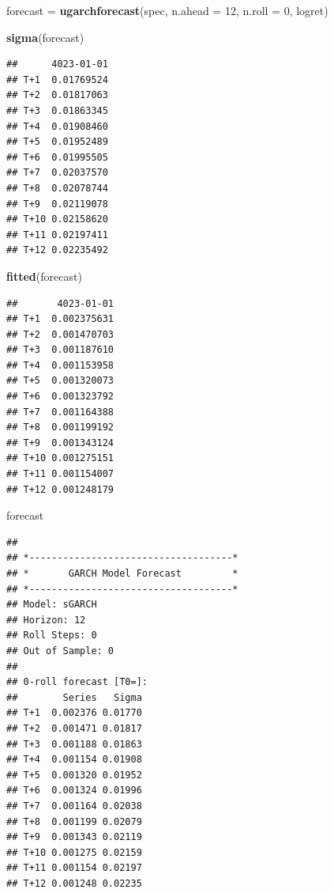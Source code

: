 \documentclass[
]{book}
\newenvironment{Shaded}{\begin{snugshade}}{\end{snugshade}}
\newcommand{\AttributeTok}[1]{\textcolor[rgb]{0.13,0.29,0.53}{#1}}
\newcommand{\DecValTok}[1]{\textcolor[rgb]{0.00,0.00,0.81}{#1}}
\newcommand{\FunctionTok}[1]{\textcolor[rgb]{0.13,0.29,0.53}{\textbf{#1}}}
\newcommand{\NormalTok}[1]{#1}
\newcommand{\OtherTok}[1]{\textcolor[rgb]{0.56,0.35,0.01}{#1}}
\begin{document}
\begin{Shaded}
\begin{Highlighting}[]
\NormalTok{forecast }\OtherTok{=} \FunctionTok{ugarchforecast}\NormalTok{(spec, }\AttributeTok{n.ahead =} \DecValTok{12}\NormalTok{, }\AttributeTok{n.roll =} \DecValTok{0}\NormalTok{, logret)}

\FunctionTok{sigma}\NormalTok{(forecast)}
\end{Highlighting}
\end{Shaded}

\begin{verbatim}
##      4023-01-01
## T+1  0.01769524
## T+2  0.01817063
## T+3  0.01863345
## T+4  0.01908460
## T+5  0.01952489
## T+6  0.01995505
## T+7  0.02037570
## T+8  0.02078744
## T+9  0.02119078
## T+10 0.02158620
## T+11 0.02197411
## T+12 0.02235492
\end{verbatim}

\begin{Shaded}
\begin{Highlighting}[]
\FunctionTok{fitted}\NormalTok{(forecast)}
\end{Highlighting}
\end{Shaded}

\begin{verbatim}
##       4023-01-01
## T+1  0.002375631
## T+2  0.001470703
## T+3  0.001187610
## T+4  0.001153958
## T+5  0.001320073
## T+6  0.001323792
## T+7  0.001164388
## T+8  0.001199192
## T+9  0.001343124
## T+10 0.001275151
## T+11 0.001154007
## T+12 0.001248179
\end{verbatim}

\begin{Shaded}
\begin{Highlighting}[]
\NormalTok{forecast}
\end{Highlighting}
\end{Shaded}

\begin{verbatim}
## 
## *------------------------------------*
## *       GARCH Model Forecast         *
## *------------------------------------*
## Model: sGARCH
## Horizon: 12
## Roll Steps: 0
## Out of Sample: 0
## 
## 0-roll forecast [T0=]:
##        Series   Sigma
## T+1  0.002376 0.01770
## T+2  0.001471 0.01817
## T+3  0.001188 0.01863
## T+4  0.001154 0.01908
## T+5  0.001320 0.01952
## T+6  0.001324 0.01996
## T+7  0.001164 0.02038
## T+8  0.001199 0.02079
## T+9  0.001343 0.02119
## T+10 0.001275 0.02159
## T+11 0.001154 0.02197
## T+12 0.001248 0.02235
\end{verbatim}
\end{document}
